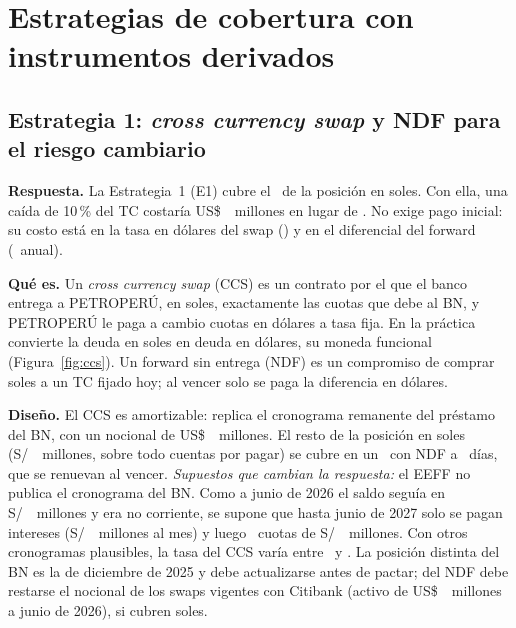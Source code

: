 \section{Estrategias de cobertura con instrumentos derivados}

\subsection{Estrategia 1: \emph{cross currency swap} y NDF para el riesgo cambiario}

\textbf{Respuesta.} La Estrategia~1 (E1) cubre el \CoberturaFX\ de la posición en soles. Con ella, una caída de 10\,\%
del TC costaría US\$~\EscConCobMenosDiez\ millones en lugar de \EscSinCobMenosDiez. No exige pago inicial: su costo
está en la tasa en dólares del swap (\CCSTasaAllIn) y en el diferencial del forward (\NDFCostoAnual\ anual).

\textbf{Qué es.} Un \emph{cross currency swap} (CCS) es un contrato por el que el banco entrega a PETROPERÚ, en
soles, exactamente las cuotas que debe al BN, y PETROPERÚ le paga a cambio cuotas en dólares a tasa fija. En la
práctica convierte la deuda en soles en deuda en dólares, su moneda funcional (Figura~\ref{fig:ccs}). Un forward sin
entrega (NDF) es un compromiso de comprar soles a un TC fijado hoy; al vencer solo se paga la diferencia en dólares.

\textbf{Diseño.} El CCS es amortizable: replica el cronograma remanente del préstamo del BN, con un nocional de
US\$~\CCSNocionalUSD\ millones. El resto de la posición en soles (S/~\RestoPEN\ millones, sobre todo cuentas por
pagar) se cubre en un \NDFPct\ con NDF a \NDFDias\ días, que se renuevan al vencer. \emph{Supuestos que cambian la
respuesta:} el EEFF no publica el cronograma del BN. Como a junio de 2026 el saldo seguía en S/~\BNSaldoJunio\
millones y era no corriente, se supone que hasta junio de 2027 solo se pagan intereses (S/~\BNCuota\ millones al mes)
y luego \BNCuotasAmort\ cuotas de S/~\BNCuotaAmort\ millones. Con otros cronogramas plausibles, la tasa del CCS varía
entre \CCSTasaMin\ y \CCSTasaMax. La posición distinta del BN es la de diciembre de 2025 y debe actualizarse antes de
pactar; del NDF debe restarse el nocional de los swaps vigentes con Citibank (activo de US\$~\SwapCitiJunio\ millones
a junio de 2026), si cubren soles.

